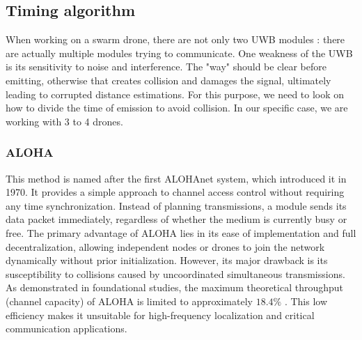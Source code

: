 \subsection{Timing algorithm}\label{UWB_Algo_timings}
When working on a swarm drone, there are not only two UWB modules : there are actually multiple modules trying to communicate. One weakness of the UWB is its sensitivity to noise and interference. The "way" should be clear before emitting, otherwise that creates collision and damages the signal, ultimately leading to corrupted distance estimations.
For this purpose, we need to look on how to divide the time of emission to avoid collision. In our specific case, we are working with 3 to 4 drones.
\subsubsection{ALOHA}
This method is named after the first ALOHAnet system, which introduced it in 1970. It provides a simple approach to channel access control without requiring any time synchronization. Instead of planning transmissions, a module sends its data packet immediately, regardless of whether the medium is currently busy or free.
The primary advantage of  ALOHA lies in its ease of implementation and full decentralization, allowing independent nodes or drones to join the network dynamically without prior initialization. 
However, its major drawback is its susceptibility to collisions caused by uncoordinated simultaneous transmissions. As demonstrated in foundational studies, the maximum theoretical throughput (channel capacity) of  ALOHA is limited to approximately $18.4\%$ \cite{noauthor_pdf_nodate}. This low efficiency makes it unsuitable for high-frequency localization and critical communication applications.


